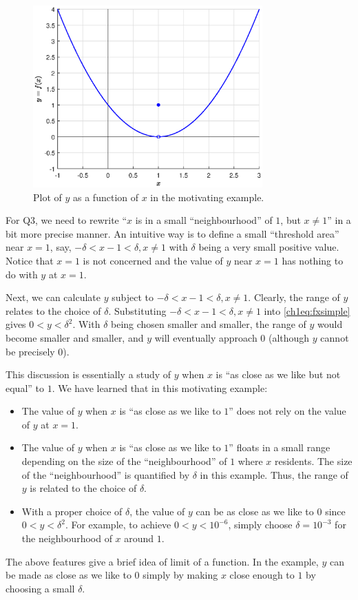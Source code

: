 \begin{figure}
\centering
\includegraphics[width=250pt]{chapters/part-1/figures/fig_fxsimple.eps}
\caption{Plot of $y$ as a function of $x$ in the motivating example.} \label{ch1fig:fxsimpleexample}
\end{figure}

For Q3, we need to rewrite ``$x$ is in a small ``neighbourhood'' of $1$, but $x \neq 1$'' in a bit more precise manner. An intuitive way is to define a small ``threshold area'' near $x=1$, say, $-\delta < x-1 < \delta, x \neq 1$ with $\delta$ being a very small positive value. Notice that $x=1$ is not concerned and the value of $y$ near $x=1$ has nothing to do with $y$ at $x=1$.

Next, we can calculate $y$ subject to $-\delta < x-1 < \delta, x \neq 1$. Clearly, the range of $y$ relates to the choice of $\delta$. Substituting $-\delta < x-1 < \delta, x \neq 1$ into \eqref{ch1eq:fxsimple} gives $0 < y < \delta^2$. With $\delta$ being chosen smaller and smaller, the range of $y$ would become smaller and smaller, and $y$ will eventually approach $0$ (although $y$ cannot be precisely $0$).

This discussion is essentially a study of $y$ when $x$ is ``as close as we like but not equal'' to $1$. We have learned that in this motivating example:
\begin{itemize}
  \item The value of $y$ when $x$ is ``as close as we like to $1$'' does not rely on the value of $y$ at $x = 1$.
  \item The value of $y$ when $x$ is ``as close as we like to $1$'' floats in a small range depending on the size of the ``neighbourhood'' of $1$ where $x$ residents. The size of the ``neighbourhood'' is quantified by $\delta$ in this example. Thus, the range of $y$ is related to the choice of $\delta$.
  \item With a proper choice of $\delta$, the value of $y$ can be as close as we like to $0$ since $0 < y < \delta^2$. For example, to achieve $0 < y < 10^{-6}$, simply choose $\delta = 10^{-3}$ for the neighbourhood of $x$ around $1$.
\end{itemize}
The above features give a brief idea of limit of a function. In the example, $y$ can be made as close as we like to $0$ simply by making $x$ close enough to $1$ by choosing a small $\delta$.

